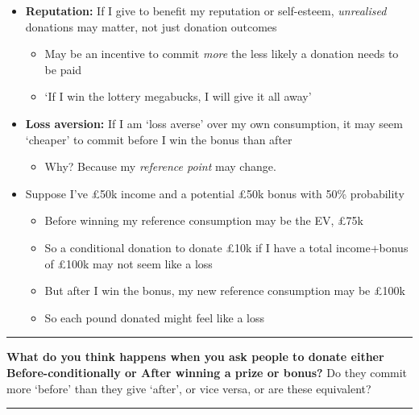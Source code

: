 \documentclass[]{article}
\providecommand{\tightlist}{%
  \setlength{\itemsep}{0pt}\setlength{\parskip}{0pt}}
\begin{document}
\begin{itemize}
\tightlist
\item
  \textbf{Reputation:} If I give to benefit my reputation or
  self-esteem, \emph{unrealised} donations may matter, not just donation
  outcomes

  \begin{itemize}
  \tightlist
  \item
    May be an incentive to commit \emph{more} the less likely a donation
    needs to be paid
  \item
    `If I win the lottery megabucks, I will give it all away'
  \end{itemize}
\item
  \textbf{Loss aversion:} If I am `loss averse' over my own consumption,
  it may seem `cheaper' to commit before I win the bonus than after

  \begin{itemize}
  \tightlist
  \item
    Why? Because my \emph{reference point} may change.
  \end{itemize}
\item
  Suppose I've \pounds50k income and a potential \pounds50k bonus with
  50\% probability

  \begin{itemize}
  \tightlist
  \item
    Before winning my reference consumption may be the EV, \pounds75k
  \item
    So a conditional donation to donate \pounds10k if I have a total
    income+bonus of \pounds100k may not seem like a loss
  \item
    But after I win the bonus, my new reference consumption may be
    \pounds100k
  \item
    So each pound donated might feel like a loss
  \end{itemize}
\end{itemize}

\begin{center}\rule{0.5\linewidth}{\linethickness}\end{center}

\textbf{What do you think happens when you ask people to donate either
Before-conditionally or After winning a prize or bonus?} Do they commit
more `before' than they give `after', or vice versa, or are these
equivalent?

\begin{center}\rule{0.5\linewidth}{\linethickness}\end{center}
\end{document}
